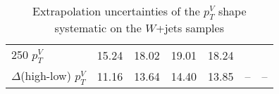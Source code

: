 \begin{table}[!htb]
\begin{tabular}{lS[table-format=3.2]S[table-format=3.2]S[table-format=3.2]S[table-format=3.2]S[table-format=3.2]S[table-format=3.2]}
    250 $p_T^V$                  & 15.24 & 18.02 & 19.01 & 18.24 &               &              \\
    $\Delta$(high-low) $p_T^V$   & 11.16 & 13.64 & 14.40 & 13.85 &     --          &      --  \\
    \bottomrule
  \end{tabular}
  \caption{Extrapolation uncertainties of the $p_T^V$ shape systematic on the
    $W$+jets samples}
\label{tab:wjets-extrapolation_uncertainties_pTV}
\end{table}